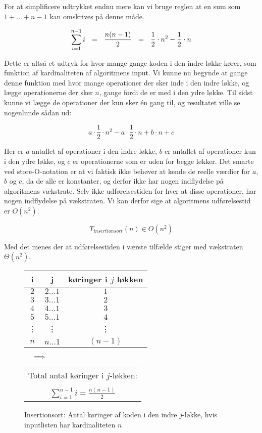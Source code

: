 For at simplificere udtrykket endnu mere kan vi bruge reglen at en sum som $1 + \dots + n -1$ kan omskrives på denne måde. \red{[Bevis??]}

$$\sum_{i=1}^{n-1}i \:\:\:=\:\:\: \frac{n(n-1)}{2} \:\:\:=\:\:\: \frac{1}{2}\cdot  n^2 - \frac{1}{2}\cdot  n$$

Dette er altså et udtryk for hvor mange gange koden i den indre løkke kører, som funktion af kardinaliteten af algoritmens input. Vi kunne nu begynde at gange denne funktion med hvor mange operationer der sker inde i den indre løkke, og lægge operationerne der sker $n$, gange fordi de er med i den ydre løkke. Til sidst kunne vi lægge de operationer der kun sker én gang til, og resultatet ville se nogenlunde sådan ud:

$$a \cdot \frac{1}{2} \cdot n^2 - a \cdot \frac{1}{2} \cdot n + b \cdot n + c$$

Her er $a$ antallet af operationer i den indre løkke, $b$ er antallet af operationer kun i den ydre løkke, og $c$ er operationerne som er uden for begge løkker. Det smarte ved store-O-notation er at vi faktisk ikke behøver at kende de reelle værdier for $a$, $b$ og $c$, da de alle er konstanter, og derfor ikke har nogen indflydelse på algoritmens vækstrate. Selv ikke udførelsestiden for hver at disse operationer, har nogen indflydelse på vækstraten. Vi kan derfor sige at algoritmens udførelsestid er $O(n^2)$.

$$T_{insertionsort}(n) \in O(n^2)$$

Med det menes der at udførelsestiden i værste tilfælde stiger med vækstraten $\Theta (n^2)$.


\begin{figure}[b]
	\begin{center}
		\padtable
		\begin{tabular}{ c|c|c }
			i & j & køringer i $j$ løkken\\
			\hline
			$2$ & $2 \dots 1$ & $1$\\
			$3$ & $3 \dots 1$ & $2$\\
			$4$ & $4 \dots 1$ & $3$\\
			$5$ & $5 \dots 1$ & $4$\\
			\vdots & \vdots & \vdots\\
			$n$ & $n \dots 1$ & $(n-1)$\\
		\end{tabular}
		$\:\:\:\:\:\: \Longrightarrow \:\:\:\:\:\: $	
		\begin{tabular}{c}
			Total antal køringer i $j$-løkken:\\
			\vspace{-4mm}
			\\
			$\displaystyle\sum_{i=1}^{n-1}i=\frac{n(n-1)}{2}$
		\end{tabular}
	\end{center}
	\caption{Insertionsort: Antal køringer af koden i den indre $j$-løkke, hvis inputlisten har kardinaliteten $n$}
	\label{fig:Insertionsort Operationer i løkker}
\end{figure}


